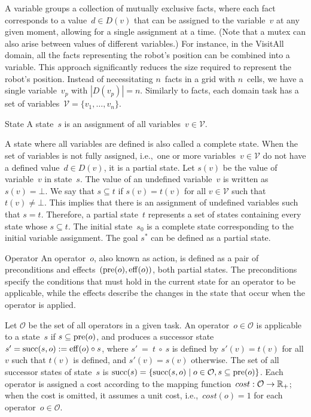 A variable groups a collection of mutually exclusive facts, where each fact corresponds to a value~$d \in D(v)$ that can be assigned to the variable~$v$ at any given moment, allowing for a single assignment at a time. (Note that a mutex can also arise between values of different variables.) For instance, in the VisitAll domain, all the facts representing the robot's position can be combined into a variable. This approach significantly reduces the size required to represent the robot's position. Instead of necessitating $n$~facts in a grid with $n$~cells, we have a single variable~$v_p$ with $|D(v_p)| = n$. Similarly to facts, each domain task has a set of variables~$\mathcal{V} = \{v_1,\ldots,v_n\}$.

\begin{definition}{State}
    \label{def:state}
    A state~$s$ is an assignment of all variables~$v \in \mathcal{V}$.
\end{definition}

A state where all variables are defined is also called a complete state. When the set of variables is not fully assigned, i.e.,~one or more variables~$v \in \mathcal{V}$ do not have a defined value~$d \in D(v)$, it is a partial state. Let $s(v)$ be the value of variable~$v$ in state~$s$. The value of an undefined variable~$v$ is written as~$s(v) = \bot$. We say that $s \subseteq t$ if $s(v) = t(v)$ for all $v \in \mathcal{V}$ such that $t(v) \neq \bot$. This implies that there is an assignment of undefined variables such that $s = t$. Therefore, a partial state~$t$ represents a set of states containing every state whose $s \subseteq t$. The initial state~$s_0$ is a complete state corresponding to the initial variable assignment. The goal $s^*$ can be defined as a partial state.

\begin{definition}{Operator}
    \label{def:operator}
    An operator~$o$, also known as action, is defined as a pair of preconditions and effects~$(\operatorname{pre}(o),\operatorname{eff}(o))$, both partial states. The preconditions specify the conditions that must hold in the current state for an operator to be applicable, while the effects describe the changes in the state that occur when the operator is applied.
\end{definition}

Let $\mathcal{O}$ be the set of all operators in a given task. An operator~$o \in \mathcal{O}$ is applicable to a state~$s$ if $s \subseteq \operatorname{pre}(o)$, and produces a successor state~$s' = \operatorname{succ}(s,o) := \operatorname{eff}(o) \circ s$, where $s'~=~t~\circ~s$ is defined by $s'(v) = t(v)$ for all $v$ such that $t(v)$ is defined, and $s'(v)=s(v)$ otherwise. The set of all successor states of state~$s$ is $\operatorname{succ}(s) = \{\operatorname{succ}(s,o) \mid o \in \mathcal{O}, s \subseteq \operatorname{pre}(o)\}$. Each operator is assigned a cost according to the mapping function~$cost:\mathcal{O}\rightarrow\mathbb{R}_{+}$; when the cost is omitted, it assumes a unit cost, i.e.,~$cost(o) = 1$ for each operator~$o \in \mathcal{O}$.

